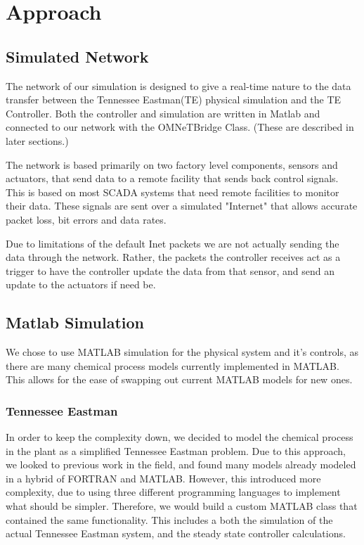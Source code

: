 \section{Approach}
\subsection{Simulated Network}

The network of our simulation is designed to give a real-time nature to the data transfer 
between the Tennessee Eastman(TE) physical simulation and the TE Controller. 
Both the controller and simulation are written in Matlab and connected to our network with 
the OMNeTBridge Class. (These are described in later sections.)

The network is based primarily on two factory level components, sensors and actuators, that 
send data to a remote facility that sends back control signals. This is based on most SCADA 
systems that need remote facilities to monitor their data. These signals are sent over a 
simulated "Internet" that allows accurate packet loss, bit errors and data rates. 

Due to limitations of the default Inet packets we are not actually sending the data through 
the network. Rather, the packets the controller receives act as a trigger to have the 
controller update the data from that sensor, and send an update to the actuators if need be. 

\subsection{Matlab Simulation}
We chose to use MATLAB simulation for the physical system and it's controls, as there are 
many chemical process models currently implemented in MATLAB. This allows for the ease of 
swapping out current MATLAB models for new ones.

\subsubsection{Tennessee Eastman}
 In order to keep the complexity down, we decided to model the chemical process in the plant 
 as a simplified Tennessee Eastman problem. Due to this approach, we looked 
 to previous work in the field, and found many models already modeled in a hybrid of FORTRAN 
 and MATLAB.  However, this introduced more complexity, due to using three different 
 programming languages to implement what should be simpler.  Therefore, we would build a 
 custom MATLAB class that contained the same functionality.  This includes a both the 
 simulation of the actual Tennessee Eastman system, and the steady state controller 
 calculations.


